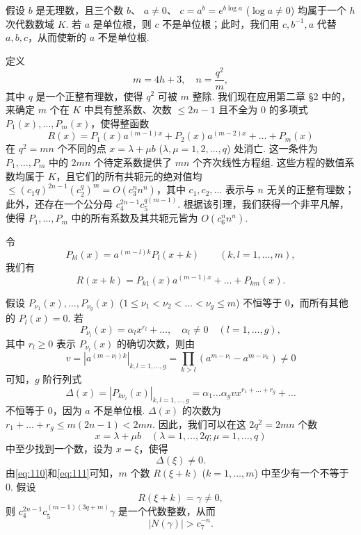 假设 $b$ 是无理数，且三个数 $b$、 $a \neq 0$、 $c = a^b = e^{b \log a}$ ($\log a \neq 0$) 均属于一个 $h$ 次代数数域 $K$. 若 $a$ 是单位根，则 $c$ 不是单位根；此时，我们用 $c, b^{-1}, a$ 代替 $a, b, c$，从而使新的 $a$ 不是单位根.

定义
\[
m = 4h + 3, \quad n = \frac{q^2}{m},
\]
其中 $q$ 是一个正整有理数，使得 $q^2$ 可被 $m$ 整除. 我们现在应用第二章 \S 2 中的，来确定 $m$ 个在 $K$ 中具有整系数、次数 $\le 2n - 1$ 且不全为 $0$ 的多项式 $P_1(x), \dots, P_m(x)$，使得整函数
\[
R(x) = P_1(x)a^{(m-1)x} + P_2(x)a^{(m-2)x} + \dots + P_m(x)
\]
在 $q^2 = mn$ 个不同的点 $x = \lambda + \mu b$ ($\lambda, \mu = 1, 2, \dots, q$) 处消亡. 这一条件为 $P_1, \dots, P_m$ 中的 $2mn$ 个待定系数提供了 $mn$ 个齐次线性方程组. 这些方程的数值系数均属于 $K$，且它们的所有共轭元的绝对值均 $\le (c_1 q)^{2n-1} (c_2^q)^m = O(c_3^n n^n)$，其中 $c_1, c_2, \dots$ 表示与 $n$ 无关的正整有理数；此外，还存在一个公分母 $c_4^{2n-1} c_5^{q(m-1)}$. 根据该引理，我们获得一个非平凡解，使得 $P_1, \dots, P_m$ 中的所有系数及其共轭元皆为 $O(c_6^n n^n)$.

令
\begin{equation}
P_{kl}(x) = a^{(m-l)k} P_l(x+k) \qquad (k, l = 1, \dots, m), \tag{110}\label{eq:110}
\end{equation}
我们有
\begin{equation}
R(x+k) = P_{k1}(x)a^{(m-1)x} + \dots + P_{km}(x). \tag{111}\label{eq:111}
\end{equation}

假设 $P_{\nu_1}(x), \dots, P_{\nu_g}(x)$ ($1 \le \nu_1 < \nu_2 < \dots < \nu_g \le m$) 不恒等于 0，而所有其他的 $P_l(x) = 0$. 若
\[
P_{\nu_l}(x) = \alpha_l x^{r_l} + \dots, \quad \alpha_l \neq 0 \quad (l=1,\dots,g),
\]
其中 $r_l \ge 0$ 表示 $P_{\nu_l}(x)$ 的确切次数，则由
\[
v = |a^{(m-\nu_l)k}|_{k,l=1,\dots,g} = \prod_{k > l} (a^{m-\nu_l} - a^{m-\nu_k}) \neq 0
\]
可知，$g$ 阶行列式
\[
\Delta(x) = | P_{k \nu_l}(x) |_{k,l=1,\dots,g} = \alpha_1 \dots \alpha_g v x^{r_1+\dots+r_g} + \dots
\]
不恒等于 $0$，因为 $a$ 不是单位根. $\Delta(x)$ 的次数为 $r_1+\dots+r_g \le m(2n-1) < 2mn$. 因此，我们可以在这 $2q^2 = 2mn$ 个数
\[
x = \lambda + \mu b \quad (\lambda = 1, \dots, 2q; \mu = 1, \dots, q)
\]
中至少找到一个数，设为 $x = \xi$，使得
\[
\Delta(\xi) \neq 0.
\]
由\eqref{eq:110}和\eqref{eq:111}可知，$m$ 个数 $R(\xi + k)$ ($k = 1, \dots, m$) 中至少有一个不等于 $0$. 假设
\[
R(\xi + k) = \gamma \neq 0,
\]
则 $c_4^{2n-1} c_5^{(m-1)(3q+m)} \gamma$ 是一个代数整数，从而
\begin{equation}
|N(\gamma)| > c_7^{-n}. \tag{112}\label{eq:112}
\end{equation}


